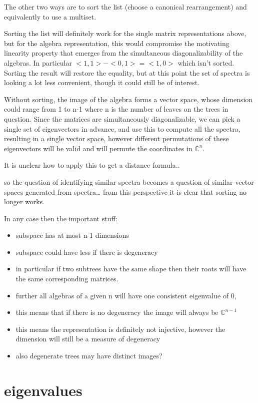 \documentclass{report}
\begin{document}
The other two ways are to sort the list (choose a canonical rearrangement) and
equivalently to use a multiset.

Sorting the list will definitely work for the single matrix representations
above, but for the algebra representation, this would compromise the
motivating linearity property that emerges from the simultaneous
diagonalizability of the algebras.
In particular $<1, 1> - <0, 1> = <1, 0>$ which isn't sorted.
Sorting the result will restore the equality, but at this point the set of
spectra is looking a lot less convenient, though it could still be of interest.

Without sorting, the image of the algebra forms a vector space, whose dimension
could range from 1 to n-1 where n is the number of leaves on the trees in
question.
Since the matrices are simultaneously diagonalizable, we can pick a single set
of eigenvectors in advance, and use this to compute all the spectra, resulting
in a single vector space, however different permutations of these eigenvectors
will be valid and will permute the coordinates in $\mathds{C}^n$.

It is unclear how to apply this to get a distance formula..

so the question of identifying similar spectra becomes a question of similar
vector spaces generated from spectra\ldots
from this perspective it is clear that sorting no longer works.

In any case then the important stuff:
\begin{itemize}
	\item subspace has at most n-1 dimensions
	\item subspace could have less if there is degeneracy
	\item in particular if two subtrees have the same shape then their roots
		will have the same corresponding matrices.
	\item further all algebras of a given n will have one consistent
		eigenvalue of 0,
	\item this means that if there is no degeneracy the image will always be
		$\mathds{C}^{n-1}$
	\item this means the representation is definitely not injective, however
		the dimension will still be a measure of degeneracy
	\item also degenerate trees may have distinct images?
\end{itemize}

\section{eigenvalues}
\end{document}
